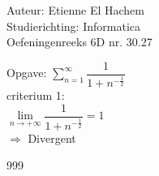 \documentclass[a4paper]{article}
\begin{document}
  
\noindent \large Auteur: Etienne El Hachem \\
\noindent \large Studierichting: Informatica\\
\noindent \large Oefeningenreeks 6D nr. 30.27\\

\medskip

\normalsize

Opgave: $\displaystyle\sum_{n=1}^{\infty} \dfrac{1}{1+n^{-\tfrac{1}{2}}}$ \\

criterium 1: \\

$\lim\limits_{n \rightarrow +\infty} \dfrac{1}{1+n^{-\tfrac{1}{2}}} = 1$ \\

$\Rightarrow$ Divergent

\begin{thebibliography}{999}
\end{thebibliography}
\end{document}
